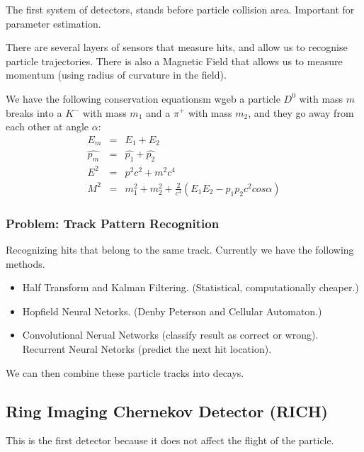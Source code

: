 The first system of detectors, stands before particle collision area. Important for parameter estimation. 

There are several layers of sensors that measure hits, and allow us to recognise particle trajectories.
There is also a Magnetic Field that allows us to measure momentum (using radius of curvature in the field).

We have the following conservation equationsm wgeb a particle $D^0$ with mass $m$ breaks into a $K^-$ with mass $m_1$ and a $\pi^+$ with mass $m_2$, and they go away from each other at angle $\alpha$:
\begin{eqnarray}
  E_m &=& E_1 + E_2 \\
  \hat{p_m} &=& \hat{p_1} + \hat{p_2} \\
  E^2 &=& p^2 c^2 + m^2 c^4 \\
  M^2 &=& m_1^2 + m_2^2 + \frac{2}{c^4} (E_1 E_2 - p_1 p_2 c^2 cos\alpha)
\end{eqnarray}

\subsubsection{Problem: Track Pattern Recognition} Recognizing hits that belong to the same track. Currently we have the following methods.
\begin{itemize}
  \item Half Transform and Kalman Filtering. (Statistical, computationally cheaper.)
  \item Hopfield Neural Netorks. (Denby Peterson and Cellular Automaton.)
  \item Convolutional Nerual Networks (classify result as correct or wrong). Recurrent Neural Netorks (predict the next hit location).
\end{itemize}
We can then combine these particle tracks into decays.

\subsection{Ring Imaging Chernekov Detector (RICH)}

This is the first detector because it does not affect the flight of the particle.


